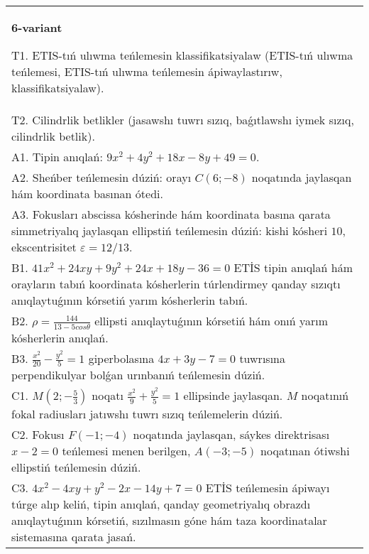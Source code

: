 \documentclass{article}
\begin{document}
\begin{tabular}{m{17cm}}
\textbf{6-variant}
\newline

T1. ETIS-tıń ulıwma teńlemesin klassifikatsiyalaw (ETIS-tıń ulıwma teńlemesi, ETIS-tıń ulıwma teńlemesin ápiwaylastırıw, klassifikatsiyalaw).\\

T2. Cilindrlik betlikler (jasawshı tuwrı sızıq, baǵıtlawshı iymek sızıq, cilindrlik betlik).\\

A1. Tipin anıqlań: $9 x^{2}+4 y^{2}+18 x-8 y+49=0$.\\

A2. Sheńber teńlemesin dúziń: orayı $C (6 ;-8) $ noqatında jaylasqan hám koordinata basınan ótedi.\\

A3. Fokusları abscissa kósherinde hám koordinata basına qarata simmetriyalıq jaylasqan ellipstiń teńlemesin dúziń: kishi kósheri $10$, ekscentrisitet $\varepsilon=12/13$.\\

B1. $41x^{2} + 24xy + 9y^{2} + 24x + 18y - 36 = 0$ ETİS tipin anıqlań hám orayların tabıń koordinata kósherlerin túrlendirmey qanday sızıqtı anıqlaytuǵının kórsetiń yarım kósherlerin tabıń.  \\

B2. $\rho = \frac{144}{13 - 5cos\theta}$ ellipsti anıqlaytuǵının kórsetiń hám onıń yarım kósherlerin anıqlań.\\

B3. $\frac{x^{2}}{20} - \frac{y^{2}}{5} = 1$ giperbolasına $4x + 3y - 7 = 0$ tuwrısına perpendikulyar bolǵan urınbanıń teńlemesin dúziń.  \\

C1. $M(2; - \frac{5}{3})$ noqatı $\frac{x^{2}}{9} + \frac{y^{2}}{5} = 1$ ellipsinde jaylasqan. $M$ noqatınıń fokal radiusları jatıwshı tuwrı sızıq teńlemelerin dúziń.  \\

C2. Fokusı $F( - 1; - 4)$ noqatında jaylasqan, sáykes direktrisası $x - 2 = 0$ teńlemesi menen berilgen, $A( - 3; - 5)$ noqatınan ótiwshi ellipstiń teńlemesin dúziń.  \\

C3. $4x^{2} - 4xy + y^{2} - 2x - 14y + 7 = 0$ ETİS teńlemesin ápiwayı túrge alıp keliń, tipin anıqlań, qanday geometriyalıq obrazdı anıqlaytuǵının kórsetiń, sızılmasın góne hám taza koordinatalar sistemasına qarata jasań.  \\

\end{tabular}
\vspace{1cm}
\end{document}
